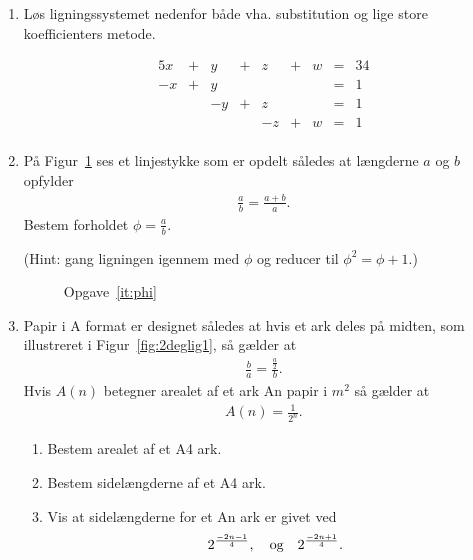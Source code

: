 \begin{enumerate}
\item Løs ligningssystemet nedenfor både vha. substitution og lige store koefficienters metode.

\begin{alignat*}{5}
x & {}+{} &  y & {}+{} & z &{}+{}&w & {}={} & 34 \\
-x & {}+{} &  y & {}{} & &{}{}&  & {}={} & 1 \\
&  &  -y & {}+{} & z & & & {}={} & 1 \\
&  &   &&-z &{}+{}& w & {}={} & 1 \\
\end{alignat*}

\item \label{it:phi} På Figur~\ref{fig:phi} ses et linjestykke som er opdelt således at længderne $a$ og $b$ opfylder
\begin{align*}
\frac{a}{b}=\frac{a+b}{a}.
\end{align*}
Bestem forholdet $\phi=\frac{a}{b}$. 

(Hint: gang ligningen igennem med $\phi$ og reducer til $\phi^2=\phi+1$.)

\begin{figure}
	\centering
	\caption{Opgave~\ref{it:phi}}
	\label{fig:phi}
\end{figure}

\item Papir i A format er designet således at hvis et ark deles på midten, som illustreret i Figur~\ref{fig:2deglig1}, så gælder at
\begin{align*}
\frac{b}{a}=\frac{\frac{a}{2}}{b}.
\end{align*}
Hvis $A(n)$ betegner arealet af et ark An papir i $m^2$ så gælder at
\begin{align*}
A(n)= \frac{1}{2^n}.
\end{align*}
\begin{enumerate}
	\item Bestem arealet af et A4 ark.
	\item Bestem sidelængderne af et A4 ark.
	\item Vis at sidelængderne for et An ark er givet ved
	\begin{align*}
	2^{\frac{-2n-1}{4}},\quad \textup{og}\quad 2^{ \frac{-2n+1}{4}}.
	\end{align*}
\end{enumerate}


\end{enumerate}
